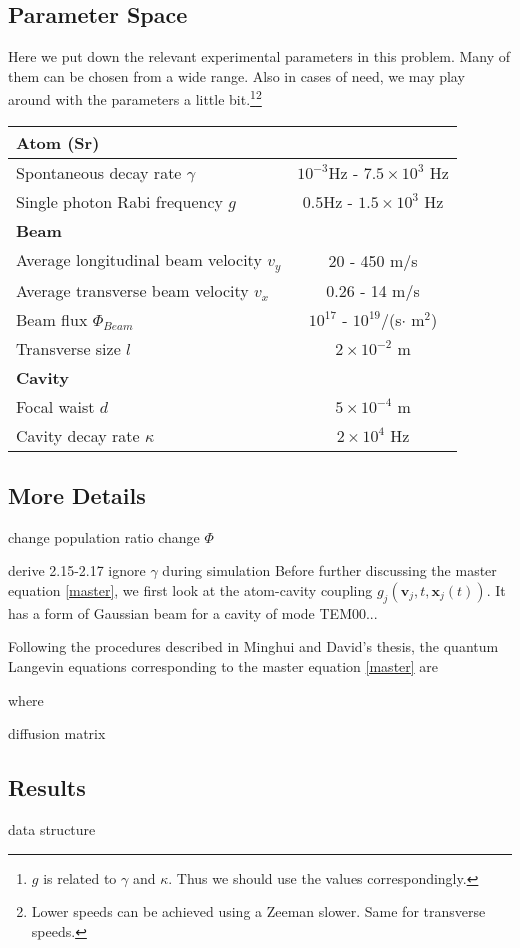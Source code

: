 \documentclass{article}
\begin{document}
\subsection{Parameter Space}
Here we put down the relevant experimental parameters in this problem. Many of them can be chosen from a wide range. Also in cases of need, we may play around with the parameters a little bit.\footnote{$g$ is related to $\gamma$ and $\kappa$. Thus we should use the values correspondingly.}\footnote{Lower speeds can be achieved using a Zeeman slower. Same for transverse speeds.}
\begin{center}
\begin{tabular}{ |l |c|   }
\hline
\textbf{Atom (Sr)} & \\\hline
Spontaneous decay rate $\gamma$ & $10^{-3}$Hz - $7.5\times10^3$ Hz \\\hline
Single photon Rabi frequency $g$ & $0.5$Hz - $1.5\times 10^3$ Hz\\\hline
\textbf{Beam} & \\\hline
Average longitudinal beam velocity $v_y$ & 20 - 450 m/s\\\hline
Average transverse beam velocity $v_x$  & 0.26 - 14 m/s\\\hline
Beam flux $\Phi_{Beam}$  & $10^{17}$ - $10^{19}$/(s$\cdot$ m$^2$)\\\hline
Transverse size $l$ & $2\times10^{-2}$ m\\\hline
\textbf{Cavity} & \\\hline
Focal waist $d$  & $5\times10^{-4}$ m\\\hline
Cavity decay rate $\kappa$ & $2\times10^4$ Hz\\\hline
\end{tabular}
\end{center}


\subsection{More Details}
change population ratio
change $\Phi$

derive 2.15-2.17
ignore $\gamma$ during simulation
Before further discussing the master equation \ref{master}, we first look at the atom-cavity coupling $g_j(\textbf{v}_j,t,\textbf{x}_j(t))$. It has a form of Gaussian beam for a cavity of mode TEM00...

Following the procedures described in Minghui and David's thesis, the quantum Langevin equations corresponding to the master equation \ref{master} are

where

diffusion matrix


\subsection{Results}
data structure

\printbibliography
\end{document}
